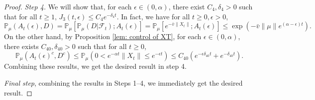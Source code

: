 \documentclass[12pt,a4paper]{amsart}
\theoremstyle{plain}
\theoremstyle{definition}
\numberwithin{equation}{section}
\begin{document}
\begin{proof}
\emph{Step 4.}
We will show that, for each $\epsilon\in (0,  \alpha)$, there exist $C_4,\delta_4>0$ such that for all $t\geq 1$, $
J_3(t,\epsilon)\leq C_4e^{-\delta_4 t}.
$
In fact, we have  for all $t\geq 0, \epsilon >0$,
\[   
  \mathbb P_{\mu}(A_{t}(\epsilon), D) 
  = \mathbb P_{\mu}[\mathbb P_{\mu}(D|\mathscr F_t);A_t(\epsilon)]
  = \mathbb P_\mu[e^{-\bar v\|X_t\|};A_t(\epsilon)]
  \leq \exp({-\bar v \|\mu\|e^{(\alpha - \epsilon)t}}).
\]
On the other hand, by Proposition \ref{lem: control of XT}, for each $\epsilon \in (0, \alpha)$, there exists  $C_{40}, \delta_{40}>0$ such that for all $t\geq 0$,
\begin{equation}
  \mathbb P_\mu(A_t(\epsilon)^c,D^c) 
  \leq \mathbb P_\mu(0 < e^{-\alpha t}\|X_t\| 
  \leq e^{ - \epsilon t}) \leq C_{40} (e^{-\epsilon \delta_{40} t}+e^{-\delta_{40} t}).
\end{equation}
Combining these results, we get the desired result in step 4.

\emph{Final step}, combining the results in Steps 1--4, we immediately get the desired result.
\end{proof}
\end{document}

